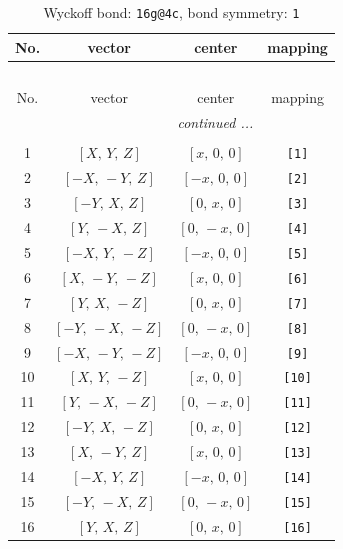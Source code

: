 \documentclass[fleqn,8pt]{jsarticle}
\begin{document}
\begin{longtable}{cccc}
\caption{Wyckoff bond: {\tt 16g@4c}, bond symmetry: {\tt 1}}
 \\
 \hline \hline
No. & vector & center & mapping \\ \hline \endfirsthead

\multicolumn{3}{l}{\tablename\ \thetable{}} \\
 \hline \hline
No. & vector & center & mapping \\ \hline \endhead

 \hline \hline
\multicolumn{3}{r}{\footnotesize\it continued ...} \\ \endfoot

 \hline \hline
\multicolumn{3}{r}{} \\ \endlastfoot

1 & $\left[ X,\, Y,\, Z \right]$ & $\left[ x,\, 0,\, 0 \right]$ & {\tt [1]} \\ \hline
2 & $\left[ - X,\, - Y,\, Z \right]$ & $\left[ - x,\, 0,\, 0 \right]$ & {\tt [2]} \\ \hline
3 & $\left[ - Y,\, X,\, Z \right]$ & $\left[ 0,\, x,\, 0 \right]$ & {\tt [3]} \\ \hline
4 & $\left[ Y,\, - X,\, Z \right]$ & $\left[ 0,\, - x,\, 0 \right]$ & {\tt [4]} \\ \hline
5 & $\left[ - X,\, Y,\, - Z \right]$ & $\left[ - x,\, 0,\, 0 \right]$ & {\tt [5]} \\ \hline
6 & $\left[ X,\, - Y,\, - Z \right]$ & $\left[ x,\, 0,\, 0 \right]$ & {\tt [6]} \\ \hline
7 & $\left[ Y,\, X,\, - Z \right]$ & $\left[ 0,\, x,\, 0 \right]$ & {\tt [7]} \\ \hline
8 & $\left[ - Y,\, - X,\, - Z \right]$ & $\left[ 0,\, - x,\, 0 \right]$ & {\tt [8]} \\ \hline
9 & $\left[ - X,\, - Y,\, - Z \right]$ & $\left[ - x,\, 0,\, 0 \right]$ & {\tt [9]} \\ \hline
10 & $\left[ X,\, Y,\, - Z \right]$ & $\left[ x,\, 0,\, 0 \right]$ & {\tt [10]} \\ \hline
11 & $\left[ Y,\, - X,\, - Z \right]$ & $\left[ 0,\, - x,\, 0 \right]$ & {\tt [11]} \\ \hline
12 & $\left[ - Y,\, X,\, - Z \right]$ & $\left[ 0,\, x,\, 0 \right]$ & {\tt [12]} \\ \hline
13 & $\left[ X,\, - Y,\, Z \right]$ & $\left[ x,\, 0,\, 0 \right]$ & {\tt [13]} \\ \hline
14 & $\left[ - X,\, Y,\, Z \right]$ & $\left[ - x,\, 0,\, 0 \right]$ & {\tt [14]} \\ \hline
15 & $\left[ - Y,\, - X,\, Z \right]$ & $\left[ 0,\, - x,\, 0 \right]$ & {\tt [15]} \\ \hline
16 & $\left[ Y,\, X,\, Z \right]$ & $\left[ 0,\, x,\, 0 \right]$ & {\tt [16]} \\
\end{longtable}
\end{document}
